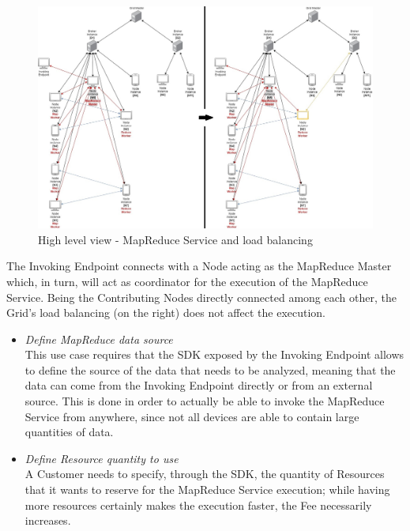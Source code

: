 \begin{itemize}
\begin{itemize}
        \begin{figure}[!ht]
            \centering
            \includegraphics[width=\linewidth]{document/chapters/chapter_6/images/mapreduce_load_balancing.jpg}
            \caption{High level view - MapReduce Service and load balancing}
            \label{fig:mapreduce_load_balancing}
        \end{figure}

        The Invoking Endpoint connects with a Node acting as the MapReduce Master which, in turn, will act as coordinator for the execution of the MapReduce Service. Being the Contributing Nodes directly connected among each other, the Grid's load balancing (on the right) does not affect the execution.


        \begin{itemize}
            \item \textit{Define MapReduce data source}\\
            This use case requires that the SDK exposed by the Invoking Endpoint allows to define the source of the data that needs to be analyzed, meaning that the data can come from the Invoking Endpoint directly or from an external source. This is done in order to actually be able to invoke the MapReduce Service from anywhere, since not all devices are able to contain large quantities of data.

            \item \textit{Define Resource quantity to use}\\
            A Customer needs to specify, through the SDK, the quantity of Resources that it wants to reserve for the MapReduce Service execution; while having more resources certainly makes the execution faster, the Fee necessarily increases.


\end{itemize}
\end{itemize}
\end{itemize}
